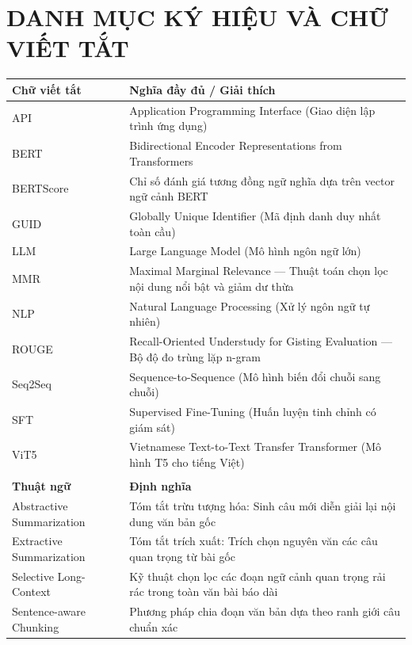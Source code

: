 \chapter*{DANH MỤC KÝ HIỆU VÀ CHỮ VIẾT TẮT}

\begin{longtable}{|>{\raggedright\arraybackslash}p{3.6cm}|>{\raggedright\arraybackslash}p{10.4cm}|}
  \hline
  \textbf{Chữ viết tắt} & \textbf{Nghĩa đầy đủ / Giải thích} \\
  \hline
  API   & Application Programming Interface (Giao diện lập trình ứng dụng) \\ \hline
  BERT  & Bidirectional Encoder Representations from Transformers \\ \hline
  BERTScore & Chỉ số đánh giá tương đồng ngữ nghĩa dựa trên vector ngữ cảnh BERT \\ \hline
  GUID  & Globally Unique Identifier (Mã định danh duy nhất toàn cầu) \\ \hline
  LLM   & Large Language Model (Mô hình ngôn ngữ lớn) \\ \hline
  MMR   & Maximal Marginal Relevance --- Thuật toán chọn lọc nội dung nổi bật và giảm dư thừa \\ \hline
  NLP   & Natural Language Processing (Xử lý ngôn ngữ tự nhiên) \\ \hline
  ROUGE & Recall-Oriented Understudy for Gisting Evaluation --- Bộ độ đo trùng lặp n-gram \\ \hline
  Seq2Seq & Sequence-to-Sequence (Mô hình biến đổi chuỗi sang chuỗi) \\ \hline
  SFT   & Supervised Fine-Tuning (Huấn luyện tinh chỉnh có giám sát) \\ \hline
  ViT5  & Vietnamese Text-to-Text Transfer Transformer (Mô hình T5 cho tiếng Việt) \\ \hline
  \multicolumn{2}{l}{} \\
  \hline
  \textbf{Thuật ngữ} & \textbf{Định nghĩa} \\ \hline
  Abstractive Summarization & Tóm tắt trừu tượng hóa: Sinh câu mới diễn giải lại nội dung văn bản gốc \\ \hline
  Extractive Summarization  & Tóm tắt trích xuất: Trích chọn nguyên văn các câu quan trọng từ bài gốc \\ \hline
  Selective Long-Context   & Kỹ thuật chọn lọc các đoạn ngữ cảnh quan trọng rải rác trong toàn văn bài báo dài \\ \hline
  Sentence-aware Chunking  & Phương pháp chia đoạn văn bản dựa theo ranh giới câu chuẩn xác \\ \hline

\end{longtable}
